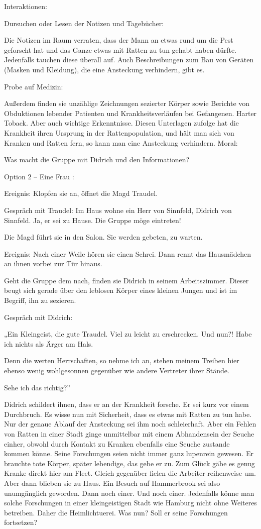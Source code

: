 Interaktionen:

Dursuchen oder Lesen der Notizen und Tagebücher:

Die Notizen im Raum verraten, dass der Mann an etwas rund um die Pest geforscht hat und das Ganze etwas mit Ratten zu tun gehabt haben dürfte. Jedenfalls tauchen diese überall auf. Auch Beschreibungen zum Bau von Geräten (Masken und Kleidung), die eine Ansteckung verhindern, gibt es.

Probe auf Medizin:

Außerdem finden sie unzählige Zeichnungen sezierter Körper sowie Berichte von Obduktionen lebender Patienten und Krankheitsverläufen bei Gefangenen. Harter Toback. Aber auch wichtige Erkenntnisse. Diesen Unterlagen zufolge hat die Krankheit ihren Ursprung in der Rattenpopulation, und hält man sich von Kranken und Ratten fern, so kann man eine Ansteckung verhindern.
Moral:

Was macht die Gruppe mit Didrich und den Informationen?

Option 2 – Eine Frau
:

Ereignis: Klopfen sie an, öffnet die Magd Traudel.

Gespräch mit Traudel: Im Haus wohne ein Herr von Sinnfeld, Didrich von Sinnfeld. Ja, er sei zu Hause. Die Gruppe möge eintreten!

Die Magd führt sie in den Salon. Sie werden gebeten, zu warten.

Ereignis: Nach einer Weile hören sie einen Schrei. Dann rennt das Hausmädchen an ihnen vorbei zur Tür hinaus.

Geht die Gruppe dem nach, finden sie Didrich in seinem Arbeitszimmer. Dieser beugt sich gerade über den leblosen Körper eines kleinen Jungen und ist im Begriff, ihn zu sezieren.

Gespräch mit Didrich:

„Ein Kleingeist, die gute Traudel. Viel zu leicht zu erschrecken. Und nun?! Habe ich nichts als Ärger am Hals.

Denn die werten Herrschaften, so nehme ich an, stehen meinem Treiben hier ebenso wenig wohlgesonnen gegenüber wie andere Vertreter ihrer Stände.

Sehe ich das richtig?”

Didrich schildert ihnen, dass er an der Krankheit forsche. Er sei kurz vor einem Durchbruch. Es wisse nun mit Sicherheit, dass es etwas mit Ratten zu tun habe. Nur der genaue Ablauf der Ansteckung sei ihm noch schleierhaft. Aber ein Fehlen von Ratten in einer Stadt ginge unmittelbar mit einem Abhandensein der Seuche einher, obwohl durch Kontakt zu Kranken ebenfalls eine Seuche zustande kommen könne. Seine Forschungen seien nicht immer ganz lupenrein gewesen. Er brauchte tote Körper, später lebendige, das gebe er zu. Zum Glück gäbe es genug Kranke direkt hier am Fleet. Gleich gegenüber fielen die Arbeiter reihenweise um. Aber dann blieben sie zu Haus. Ein Besuch auf Hammerbrook sei also unumgänglich geworden. Dann noch einer. Und noch einer. Jedenfalls könne man solche Forschungen in einer kleingeistigen Stadt wie Hamburg nicht ohne Weiteres betreiben. Daher die Heimlichtuerei. Was nun? Soll er seine Forschungen fortsetzen?

